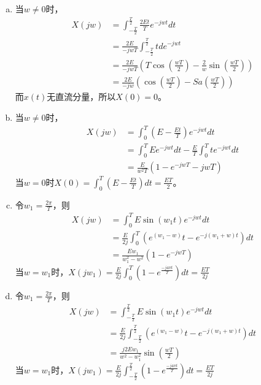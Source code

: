 \documentclass[answers]{exam}  %
\begin{document}
\begin{questions}
\begin{solution}
	\begin{enumerate}[(a)]
		\item 当$w\neq0$时，\begin{align*}
			X(jw)&=\int_{-\frac{T}{2}}^{\frac{T}{2}}\frac{2Et}{T}e^{-jwt}dt\\
			&=\frac{2E}{-jwT}\int_{-\frac{T}{2}}^{\frac{T}{2}}tde^{-jwt}\\
			&=\frac{2E}{-jwT}(T\cos(\frac{wT}{2})-\frac{2}{w}\sin(\frac{wT}{2}))\\
			&=\frac{2E}{-jw}(\cos(\frac{wT}{2})-Sa(\frac{wT}{2}))
		\end{align*}而$x(t)$无直流分量，所以$X(0)=0$。
	    \item 当$w\neq0$时，\begin{align*}
	    	X(jw)&=\int_{0}^{T}(E-\frac{Et}{T})e^{-jwt}dt\\
	    	&=\int_{0}^{T}Ee^{-jwt}dt-\frac{E}{T}\int_{0}^{T}te^{-jwt}dt\\
            &=\frac{E}{w^2T}(1-e^{-jwT}-jwT)
	    \end{align*}当$w=0$时$X(0)=\int_{0}^{T}(E-\frac{Et}{T})dt=\frac{ET}{2}$。
        \item 令$w_1=\frac{2\pi}{T}$，则
             \begin{align*}
             	X(jw)&=\int_{0}^{T}E\sin(w_1t)e^{-jwt}dt\\
             	&=\frac{E}{2j}\int_{0}^{T}(e^{(w_1-w)}t-e^{-j(w_1+w)t})dt\\
             	&=\frac{Ew_1}{w_1^2-w^2}(1-e^{-jwT})
             \end{align*}当$w=w_1$时，$X(jw_1)=\frac{E}{2j}\int_{0}^{T}(1-e^{\frac{-j4\pi t}{T}})dt=\frac{ET}{2j}$
         \item 令$w_1=\frac{2\pi}{T}$，则
         \begin{align*}
         	X(jw)&=\int_{-\frac{T}{2}}^{\frac{T}{2}}E\sin(w_1t)e^{-jwt}dt\\
         	&=\frac{E}{2j}\int_{-\frac{T}{2}}^{\frac{T}{2}}(e^{(w_1-w)}t-e^{-j(w_1+w)t})dt\\
         	&=\frac{j2Ew_1}{w^2-w_1^2}\sin(\frac{wT}{2})
         \end{align*}当$w=w_1$时，$X(jw_1)=\frac{E}{2j}\int_{-\frac{T}{2}}^{\frac{T}{2}}(1-e^{\frac{-j4\pi t}{T}})dt=\frac{ET}{2j}$
	\end{enumerate}
\end{solution}



\end{questions}
\end{document}
